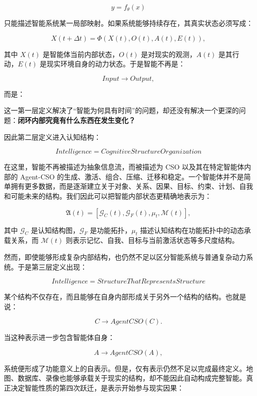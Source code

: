 \[
y=f_{\theta}(x)
\]

只能描述智能系统某一局部映射。如果系统能够持续存在，其真实状态必须写成：

\[
X(t+\Delta t)
=
\Phi
\left(
X(t),
O(t),
A(t),
E(t)
\right),
\]

其中 \(X(t)\) 是智能体当前内部状态，\(O(t)\) 是对现实的观测，\(A(t)\) 是其行动，\(E(t)\) 是现实环境自身的动力状态。于是智能不再是：

\[
Input\rightarrow Output,
\]

而是：

\begin{statementbox}
\centering
{}
\end{statementbox}

这一第一层定义解决了“智能为何具有时间”的问题，却还没有解决一个更深的问题：\textbf{闭环内部究竟有什么东西在发生变化？}

因此第二层定义进入认知结构：

\[
\boxed{
Intelligence
=
CognitiveStructureOrganization
}
\]

在这里，智能不再被描述为抽象信息流，而被描述为 CSO 以及其在特定智能体内部的 Agent-CSO 的生成、激活、组合、压缩、迁移和稳定。一个智能体并不是简单拥有更多数据，而是逐渐建立关于对象、关系、因果、目标、约束、计划、自我和可能未来的结构。我们因此可以把智能内部状态更精确地表示为：

\[
\mathfrak A(t)
=
\left[
\mathcal G_C(t),
\mathcal G_F(t),
\mu_t,
\mathcal M(t)
\right],
\]

其中 \(\mathcal G_C\) 是认知结构图，\(\mathcal G_F\) 是功能拓扑，\(\mu_t\) 描述认知结构在功能拓扑中的动态承载关系，而 \(\mathcal M(t)\) 则表示记忆、自我、目标与当前激活状态等多尺度结构。

然而，即使能够形成复杂内部结构，也仍然不足以区分智能系统与普通复杂动力系统。于是第三层定义出现：

\[
\boxed{
Intelligence
=
StructureThatRepresentsStructure
}
\]

某个结构不仅存在，而且能够在自身内部形成关于另外一个结构的结构。也就是说：

\[
C
\longrightarrow
AgentCSO(C).
\]

当这种表示进一步包含智能体自身：

\[
A
\longrightarrow
AgentCSO(A),
\]

系统便形成了功能意义上的自表示。但是，仅有表示仍然不足以完成最终定义。地图、数据库、录像也能够承载关于现实的结构，却不能因此自动构成完整智能。真正决定智能性质的第四次跃迁，是表示开始参与现实因果：

